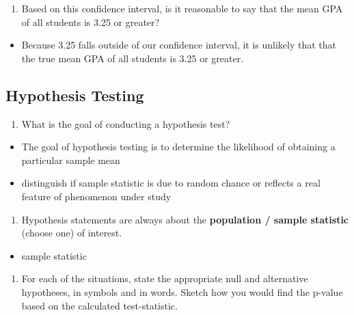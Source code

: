 \documentclass[
  openany]{book}
\providecommand{\tightlist}{%
  \setlength{\itemsep}{0pt}\setlength{\parskip}{0pt}}
\begin{document}
\begin{enumerate}
\def\labelenumi{\alph{enumi}.}
\setcounter{enumi}{2}
\tightlist
\item
  Based on this confidence interval, is it reasonable to say that the mean GPA of all students is 3.25 or greater?
\end{enumerate}

\begin{itemize}
\tightlist
\item
  Because 3.25 falls outside of our confidence interval, it is unlikely that that the true mean GPA of all students is 3.25 or greater.
\end{itemize}

\subsection{Hypothesis Testing}\label{hypothesis-testing-1}

\begin{enumerate}
\def\labelenumi{\arabic{enumi}.}
\setcounter{enumi}{7}
\tightlist
\item
  What is the goal of conducting a hypothesis test?
\end{enumerate}

\begin{itemize}
\tightlist
\item
  The goal of hypothesis testing is to determine the likelihood of obtaining a particular sample mean
\item
  distinguish if sample statistic is due to random chance or reflects a real feature of phenomenon under study
\end{itemize}

\begin{enumerate}
\def\labelenumi{\arabic{enumi}.}
\setcounter{enumi}{8}
\tightlist
\item
  Hypothesis statements are always about the \textbf{population / sample statistic} (choose one) of interest.
\end{enumerate}

\begin{itemize}
\tightlist
\item
  sample statistic
\end{itemize}

\begin{enumerate}
\def\labelenumi{\arabic{enumi}.}
\setcounter{enumi}{9}
\tightlist
\item
  For each of the situations, state the appropriate null and alternative hypotheses, in symbols and in words. Sketch how you would find the p-value based on the calculated test-statistic.
\end{enumerate}
\end{document}
